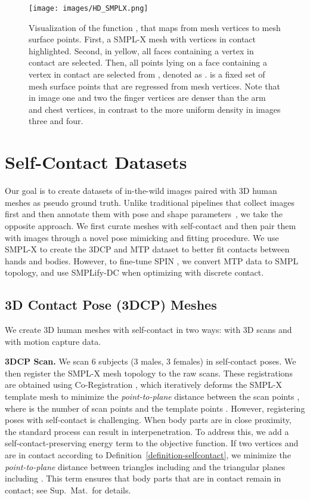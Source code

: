 \documentclass[final]{cvpr}
\newcommand{\suppmat}{Sup.~Mat.\xspace}
\newcommand{\smplifyxdc}{\mbox{SMPLify-DC}\xspace}
\theoremstyle{definition}
\begin{document}
\begin{figure}
\centerline{	\texttt{[image: images/HD\_SMPLX.png]}}
	\caption{Visualization of the function , that maps from mesh vertices to mesh surface points. First, a SMPL-X mesh with vertices in contact highlighted. Second, in yellow, all faces containing a vertex in contact are selected. Then, all points lying on a face containing a vertex in contact are selected from , denoted as .  is a fixed set of mesh surface points that are regressed from mesh vertices. Note that in image one and two the finger vertices are denser than the arm and chest vertices, in contrast to the more uniform density in images three and four.}
	\label{fig:HD_SMPLX}
\end{figure} 	\section{Self-Contact Datasets}
\label{section:SelfContactDatasets}
Our goal is to create datasets of in-the-wild images paired with 3D human meshes as pseudo ground truth. 
Unlike traditional pipelines that collect images first and then annotate them with pose and shape parameters~\cite{joo2020eft,vonMarcard2018}, we take the opposite approach. 
We first curate meshes with self-contact and then pair them with images through a novel  pose mimicking and fitting procedure. 
We use SMPL-X to create the 3DCP and MTP dataset to better fit contacts between hands and bodies. However, to fine-tune SPIN \cite{kolotouros2019learning}, we convert MTP data to SMPL topology, and use \smplifyxdc when optimizing with discrete contact.

\subsection{3D Contact Pose (3DCP) Meshes}
We create 3D human meshes with self-contact in two ways: with 3D scans and with motion capture data.

\textbf{3DCP Scan.}
We scan 6 subjects (3 males, 3 females) in self-contact poses. 
We then register the SMPL-X mesh topology to the raw scans.
These registrations are obtained using Co-Registration  \cite{Hirshberg:ECCV:2012}, which iteratively deforms the SMPL-X template mesh  to minimize the \emph{point-to-plane} distance between the scan points , where  is the number of scan points and the template points .  
However, registering poses with self-contact is challenging. When body parts are in close proximity, the standard process can result in interpenetration. 
To address this, we add a self-contact-preserving energy term to the objective function. 
If two vertices  and  are in contact according to Definition~\ref{definition-selfcontact}, we minimize the \emph{point-to-plane} distance between triangles including  and the triangular planes including  . 
This term ensures that body parts that are in contact remain in contact; see {\suppmat}~for details.
\end{document}
